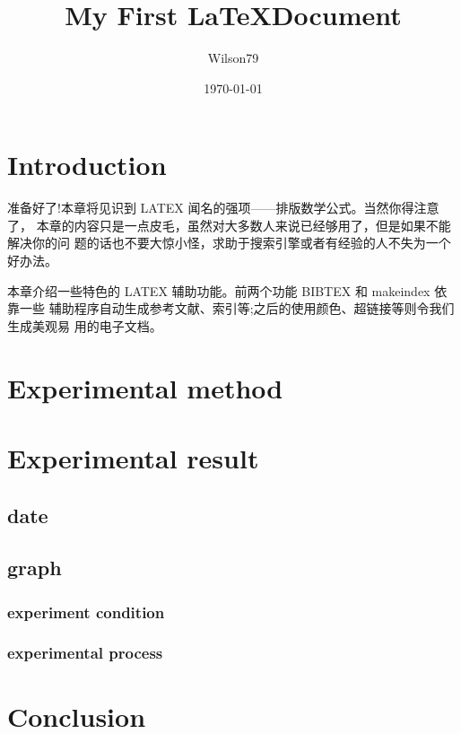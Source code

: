 \documentclass{article}
\title{My First \LaTeX \quad Document}
\author{Wilson79}
\date{\today}
\begin{document}
 
    \tableofcontents %
    \thispagestyle{empty} %
    \newpage
    \setcounter{page}{1} %
    
    \maketitle %

    \section{Introduction} 
    准备好了!本章将见识到 LATEX 闻名的强项——排版数学公式。当然你得注意了， 本章的内容只是一点皮毛，虽然对大多数人来说已经够用了，但是如果不能解决你的问 题的话也不要大惊小怪，求助于搜索引擎或者有经验的人不失为一个好办法。
    
    本章介绍一些特色的 LATEX 辅助功能。前两个功能 BIBTEX 和 makeindex 依靠一些 辅助程序自动生成参考文献、索引等;之后的使用颜色、超链接等则令我们生成美观易 用的电子文档。 

    \section{Experimental method} %

    \section{Experimental result}
    \subsection{date} %
    \subsection{graph} %
    \subsubsection{experiment condition} %
    \subsubsection{experimental process} %

    \section{Conclusion}
\end{document}
